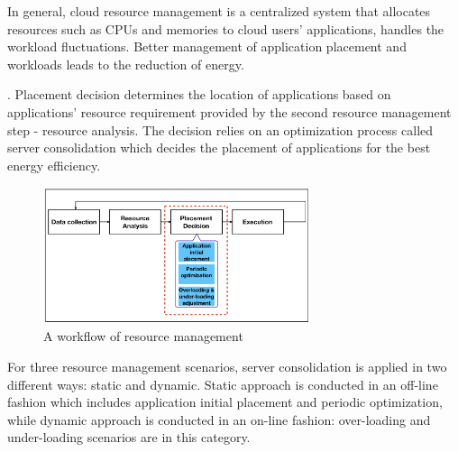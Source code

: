  In general, cloud resource management is a centralized system \cite{Jennings:2015ht} that allocates resources such as CPUs and memories to cloud users' applications, handles the workload fluctuations. Better management of application placement and workloads leads to the reduction of energy. 

. Placement decision determines the location of applications based on applications' resource requirement provided by the second resource management step - resource analysis. The decision relies on an optimization process called server consolidation which decides the placement of applications for the best energy efficiency. 
\begin{figure}
	\centering
	\includegraphics[width=0.7\textwidth]{pics/workflow_management.png}
	\caption{A workflow of resource management \cite{Mishra:2012kx}}
	\label{fig:workflow}
\end{figure}



 For three resource management scenarios, server consolidation is applied in two different ways: static and dynamic. Static approach is conducted in an off-line fashion which includes application initial placement and periodic optimization, while dynamic approach is conducted in an on-line fashion: over-loading and under-loading scenarios are in this category.


